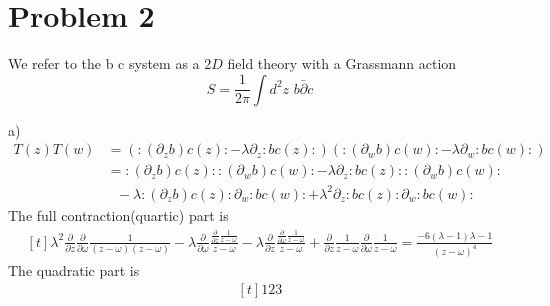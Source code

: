 \documentclass[12pt]{article}
\begin{document}
\section{Problem 2}
We refer to the b c system as a $2D$ field theory with a Grassmann action
\begin{equation}
S=\frac{1}{2\pi } \int d^2 z \,\,b  \bar{\partial} c
\end{equation}
\begin{paragraph}{a)}
\begin{equation}
\begin{split}
T(z) T(w) & =\left(  : (\partial_z b) c(z): - \lambda \partial_z : b c (z): \right) \left(  : (\partial_w b) c(w): - \lambda \partial_w : b c (w): \right)  \\
& =  : (\partial_z b) c(z):  : (\partial_w b) c(w):  - \lambda \partial_z : b c (z):  : (\partial_w b) c(w):  \\
&~~~- \lambda  : (\partial_z b) c(z):\partial_w : b c (w):  + \lambda^2 \partial_z : b c (z):\partial_w : b c (w): 
\end{split}
\end{equation}
The full contraction(quartic) part is
\begin{equation}
\begin{aligned}[t]
\lambda ^2 \frac{\partial }{\partial z}\frac{\partial }{\partial \omega }\frac{1}{(z-\omega ) (z-\omega )}-\lambda  \frac{\partial }{\partial \omega }\frac{\frac{\partial }{\partial z}\frac{1}{z-\omega }}{z-\omega }-\lambda  \frac{\partial }{\partial z}\frac{\frac{\partial }{\partial \omega }\frac{1}{z-\omega }}{z-\omega }+\frac{\partial }{\partial z}\frac{1}{z-\omega } \frac{\partial }{\partial \omega }\frac{1}{z-\omega }=\frac{-6 (\lambda -1) \lambda -1}{(z-\omega )^4}
\end{aligned}
\end{equation}
The quadratic part is
\begin{equation}
\begin{aligned}[t]
123
\end{aligned}
\end{equation}
\end{paragraph}
\end{document}

